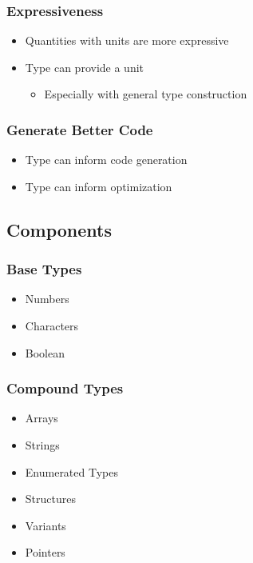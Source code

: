 \documentclass[usepdftitle=false,professionalfonts,compress ]{beamer}
\begin{document}
{
\begin{frame}\frametitle{Expressiveness}

	\begin{itemize}
	\item Quantities with units are more expressive
			\item Type can provide a unit

	\begin{itemize}
	\item Especially with general type construction
				\end{itemize}

				\end{itemize}

\end{frame}}




{
\begin{frame}\frametitle{Generate Better Code}

	\begin{itemize}
	\item Type can inform code generation
			\item Type can inform optimization
				\end{itemize}

\end{frame}}




\subsection{Components}

{
\begin{frame}\frametitle{Base Types}

	\begin{itemize}
	\item Numbers
			\item Characters
			\item Boolean
				\end{itemize}

\end{frame}}





{
\begin{frame}\frametitle{Compound Types}

	\begin{itemize}
	\item Arrays
			\item Strings
			\item Enumerated Types
			\item Structures
			\item Variants
			\item Pointers
				\end{itemize}

\end{frame}}
\end{document}
